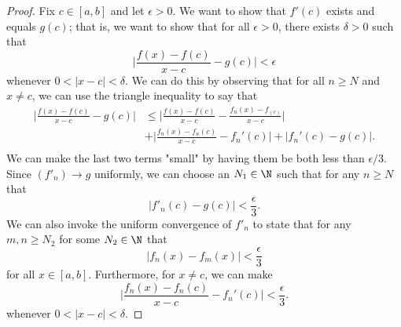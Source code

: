 \begin{proof}
    Fix \( c \in [a,b]  \) and let \( \epsilon > 0  \). We want to show that \( f'(c)  \) exists and equals \( g(c)  \); that is, we want to show that for all \( \epsilon > 0  \), there exists \( \delta > 0  \) such that 
    \[ \Big| \frac{ f(x) - f(c) }{ x - c  } - g(c)  \Big| < \epsilon  \]
    whenever \( 0 < | x -c  | < \delta  \). We can do this by observing that for all \( n \geq N  \) and \( x \neq c  \), we can use the triangle inequality to say that 
    \begin{align*}
        \Big| \frac{ f(x) - f(c)  }{ x - c  } - g(c)  \Big| &\leq \Big| \frac{ f(x) - f(c)  }{  x- c  } - \frac{ f_n(x) - f_(c)  }{ x - c  }  \Big| \\ &+ \Big| \frac{ f_n(x) - f_n(c)  }{ x - c  } - f_n'(c)  \Big|  + | f_n'(c) - g(c)   |. \\
    \end{align*}
    We can make the last two terms "small" by having them be both less than \( \epsilon / 3  \). Since \( (f'_n) \to g  \) uniformly, we can choose an \( N_1 \in \N  \) such that for any \( n \geq N  \) that 
    \[ | f'_n(c) - g(c)  | < \frac{ \epsilon  }{ 3 }. \tag{1} \]
We can also invoke the uniform convergence of \( f'_n  \) to state that for any \( m,n \geq N_2  \) for some \( N_2 \in \N  \) that 
\[ | f_n(x) - f_m(x)  | < \frac{ \epsilon  }{ 3 }  \]
for all \( x \in [a,b] \).
    Furthermore, for \( x \neq c  \), we can make 
    \[  \Big| \frac{ f_n(x) - f_n(c)  }{ x -c  } - f_n'(c)    \Big| < \frac{ \epsilon  }{ 3  }. \tag{2}  \]
    whenever \( 0 < | x - c  | < \delta  \).
    

\end{proof}
